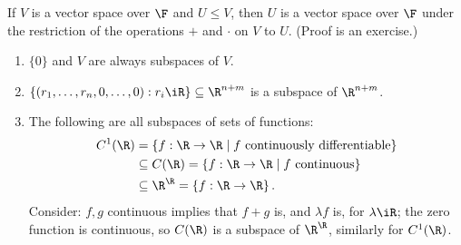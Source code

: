 \begin{lemma}
	If $V$ is a vector space over $\F$ and $U\leq V$, then $U$ is a vector space over $\F$ under the restriction of the operations $+$ and $\cdot$ on $V$ to $U$. (Proof is an exercise.) %
\end{lemma}

\vspace{-6pt}

\begin{examples}
	\begin{enumerate}
		\item $\{0\}$ and $V$ are always subspaces of $V$.
		\item $\left\{(r_1,\ldots,r_n,0,\ldots,0):r_i\iR\right\}\subseteq\R^{n+m}$ is a subspace of $\R^{n+m}$. %
		\item The following are all subspaces of sets of functions:
		\begin{align*}
			C^1(\R)
			&= \left\{f:\R\to\R \mid f \text{ continuously differentiable}\right\} \\ %
			&\subseteq C(\R) = \left\{f:\R\to\R \mid f \text{ continuous}\right\} \\
			&\subseteq \R^\R = \left\{f:\R\to\R\right\}.
		\end{align*}
		Consider: $f, g$ continuous implies that $f+g$ is, and $\lambda f$ is, for $\lambda \iR$; the zero function is continuous, so $C(\R)$ is a subspace of $\R^\R$, similarly for $C^1(\R)$.


\end{enumerate}
\end{examples}
